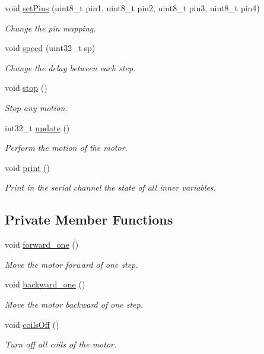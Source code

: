\begin{DoxyCompactItemize}
void \hyperlink{class_m_s_m_c___u_l_n2003_a_a19320fa4543dd8e76e338737690df235}{set\+Pins} (uint8\+\_\+t pin1, uint8\+\_\+t pin2, uint8\+\_\+t pin3, uint8\+\_\+t pin4)
\begin{DoxyCompactList}\small\item\em Change the pin mapping. \end{DoxyCompactList}\item 
void \hyperlink{class_m_s_m_c___u_l_n2003_a_ad8df164c90b2205fb65c796632889f82}{speed} (uint32\+\_\+t sp)
\begin{DoxyCompactList}\small\item\em Change the delay between each step. \end{DoxyCompactList}\item 
void \hyperlink{class_m_s_m_c___u_l_n2003_a_aba5e18f20f31fd4d6e71f50821dfeee5}{stop} ()
\begin{DoxyCompactList}\small\item\em Stop any motion. \end{DoxyCompactList}\item 
int32\+\_\+t \hyperlink{class_m_s_m_c___u_l_n2003_a_a88c46f414c19fc81662abed58ce3fd92}{update} ()
\begin{DoxyCompactList}\small\item\em Perform the motion of the motor. \end{DoxyCompactList}\item 
void \hyperlink{class_m_s_m_c___u_l_n2003_a_aa6743162bdaba01ef1fc8a79f2519897}{print} ()
\begin{DoxyCompactList}\small\item\em Print in the serial channel the state of all inner variables. \end{DoxyCompactList}\end{DoxyCompactItemize}
\subsection*{Private Member Functions}
\begin{DoxyCompactItemize}
\item 
void \hyperlink{class_m_s_m_c___u_l_n2003_a_a76c32768742d1f13f91a498224be1688}{forward\+\_\+one} ()
\begin{DoxyCompactList}\small\item\em Move the motor forward of one step. \end{DoxyCompactList}\item 
void \hyperlink{class_m_s_m_c___u_l_n2003_a_af77993ed4197f6cbcfda0b7127dccfcc}{backward\+\_\+one} ()
\begin{DoxyCompactList}\small\item\em Move the motor backward of one step. \end{DoxyCompactList}\item 
void \hyperlink{class_m_s_m_c___u_l_n2003_a_af351ae2229c5cd9f12d633a44394d2e5}{coils\+Off} ()
\begin{DoxyCompactList}\small\item\em Turn off all coils of the motor. \end{DoxyCompactList}\end{DoxyCompactItemize}
